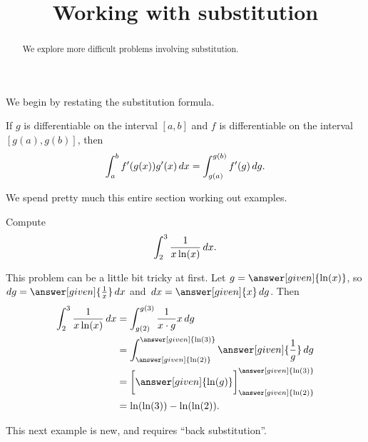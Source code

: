 \documentclass{ximera}
\title[Dig-In:]{Working with substitution}
\begin{document}
\begin{abstract}
We explore more difficult problems involving substitution.
\end{abstract}
\maketitle


We begin by restating the substitution formula.


\begin{theorem} 
If $g$ is differentiable on the interval $[a,b]$ and $f$ is
differentiable on the interval $[g(a),g(b)]$, then
\[
\int_a^b f'(g(x)) g'(x) \,d x =\int_{g(a)}^{g(b)} f'(g) \,d g.
\]
\end{theorem}

We spend pretty much this entire section working out examples.


\begin{example}
Compute
\[
\int_{2}^{3} \frac{1}{x\ln(x)} \,d x.
\]
\begin{explanation}
This problem can be a little bit tricky at first.  
Let $g=\answer[given]{\ln(x)}$, 
so $dg=\answer[given]{\frac{1}{x}}\d x$ and $\d x = \answer[given]{x} \d g$. Then
\begin{align*}
\int_{2}^{3} \frac{1}{x\ln(x)} \d x &= \int_{g(2)}^{g(3)} \frac{1}{x \cdot g} x \d g  \\
&= \int_{\answer[given]{\ln(2)}}^{\answer[given]{\ln(3)}} \answer[given]{\frac{1}{g}} \d g\\
&= \eval{\answer[given]{\ln(g)}}_{\answer[given]{\ln(2)}}^{\answer[given]{\ln(3)}}\\
& = \ln(\ln(3)) - \ln(\ln(2)).
\end{align*}
\end{explanation}
\end{example}


This next example is new, and requires ``back substitution''.
\end{document}
